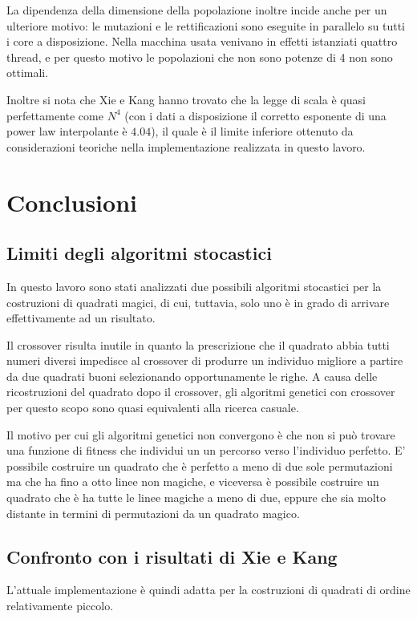 \documentclass[italian,twoside,twocolumn]{article}
\begin{document}
La dipendenza della dimensione della popolazione inoltre incide anche per un ulteriore motivo: le mutazioni e le rettificazioni sono eseguite in parallelo su tutti i core a disposizione. Nella macchina usata venivano in effetti istanziati quattro thread, e per questo motivo le popolazioni che non sono potenze di 4 non sono ottimali.

Inoltre si nota che Xie e Kang hanno trovato che la legge di scala è quasi perfettamente come $ N^4 $ (con i dati a disposizione il corretto esponente di una power law interpolante è $ \num{4.04} $), il quale è il limite inferiore ottenuto da considerazioni teoriche nella implementazione realizzata in questo lavoro.

\section{Conclusioni}

\subsection{Limiti degli algoritmi stocastici}
In questo lavoro sono stati analizzati due possibili algoritmi stocastici per la costruzioni di quadrati magici, di cui, tuttavia, solo uno è in grado di arrivare effettivamente ad un risultato. 

Il crossover risulta inutile in quanto la prescrizione che il quadrato abbia tutti numeri diversi impedisce al crossover di produrre un individuo migliore a partire da due quadrati buoni selezionando opportunamente le righe. A causa delle ricostruzioni del quadrato dopo il crossover, gli algoritmi genetici con crossover per questo scopo sono quasi equivalenti alla ricerca casuale. 

Il motivo per cui gli algoritmi genetici non convergono è che non si può trovare una funzione di fitness che individui un un percorso verso l'individuo perfetto. E' possibile costruire un quadrato che è perfetto a meno di due sole permutazioni ma che ha fino a otto linee non magiche, e viceversa è possibile costruire un quadrato che è ha tutte le linee magiche a meno di due, eppure che sia molto distante in termini di permutazioni da un quadrato magico.


\subsection{Confronto con i risultati di Xie e Kang}

L'attuale implementazione è quindi adatta per la costruzioni di quadrati di ordine relativamente piccolo.
\end{document}
